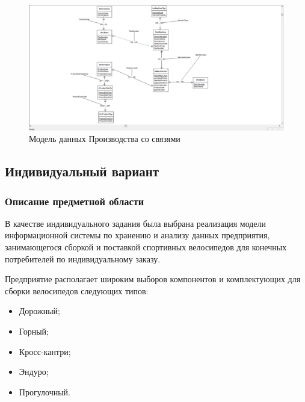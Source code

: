 \documentclass[a4paper,14pt]{extarticle}
\newcommand{\erassistant}{\textbf{ErAssistant~}}
\newcommand{\individual}{Индивидуальный вариант~}
\begin{document}
\begin{figure}[h!]
	\centering
	\includegraphics[width=0.7\linewidth]{images/1-metod}
	\caption{Модель данных Производства со связями}
	\label{fig:1-metod}
\end{figure}


%

\newpage
\subsection{\individual}
\subsubsection*{Описание предметной области}
В качестве индивидуального задания была выбрана реализация модели информационной системы по хранению и анализу данных  предприятия, занимающегося сборкой и поставкой спортивных велосипедов для конечных потребителей по индивидуальному заказу.

Предприятие располагает широким выборов компонентов и комплектующих для сборки велосипедов следующих типов:
\begin{itemize}
	\item Дорожный;
	\item Горный;
	\item Кросс-кантри;
	\item Эндуро;
	\item Прогулочный.
\end{itemize}
\end{document}

